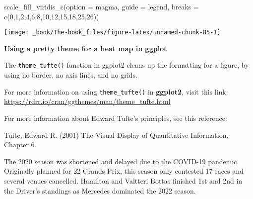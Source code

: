 \documentclass[
]{book}
\newenvironment{Shaded}{\begin{snugshade}}{\end{snugshade}}
\newcommand{\AttributeTok}[1]{\textcolor[rgb]{0.77,0.63,0.00}{#1}}
\newcommand{\DecValTok}[1]{\textcolor[rgb]{0.00,0.00,0.81}{#1}}
\newcommand{\FunctionTok}[1]{\textcolor[rgb]{0.00,0.00,0.00}{#1}}
\newcommand{\NormalTok}[1]{#1}
\newcommand{\StringTok}[1]{\textcolor[rgb]{0.31,0.60,0.02}{#1}}
\begin{document}
\begin{Shaded}
\begin{Highlighting}[]
  \FunctionTok{scale\_fill\_viridis\_c}\NormalTok{(}\AttributeTok{option =} \StringTok{\textquotesingle{}magma\textquotesingle{}}\NormalTok{,}
                       \AttributeTok{guide =} \StringTok{\textquotesingle{}legend\textquotesingle{}}\NormalTok{,}
                       \AttributeTok{breaks =} \FunctionTok{c}\NormalTok{(}\DecValTok{0}\NormalTok{,}\DecValTok{1}\NormalTok{,}\DecValTok{2}\NormalTok{,}\DecValTok{4}\NormalTok{,}\DecValTok{6}\NormalTok{,}\DecValTok{8}\NormalTok{,}\DecValTok{10}\NormalTok{,}\DecValTok{12}\NormalTok{,}\DecValTok{15}\NormalTok{,}\DecValTok{18}\NormalTok{,}\DecValTok{25}\NormalTok{,}\DecValTok{26}\NormalTok{))}
\end{Highlighting}
\end{Shaded}

\begin{center}\texttt{[image: \_book/The-book\_files/figure-latex/unnamed-chunk-85-1]} \end{center}

\begin{blackbox}

\begin{center}
\textbf{Using a pretty theme for a heat map in ggplot}

\end{center}

The \texttt{theme\_tufte()} function in ggplot2 cleans up the formatting for a figure, by using no border, no axis lines, and no grids.

For more information on using \texttt{theme\_tufte()} in \textbf{ggplot2}, visit this link: \url{https://rdrr.io/cran/ggthemes/man/theme_tufte.html}

For more information about Edward Tufte's principles, see this reference:

Tufte, Edward R. (2001) The Visual Display of Quantitative Information, Chapter 6.

\end{blackbox}

The 2020 season was shortened and delayed due to the COVID-19 pandemic. Originally planned for 22 Grands Prix, this season only contested 17 races and several venues cancelled. Hamilton and Valtteri Bottas finished 1st and 2nd in the Driver's standings as Mercedes dominated the 2022 season.
\end{document}
